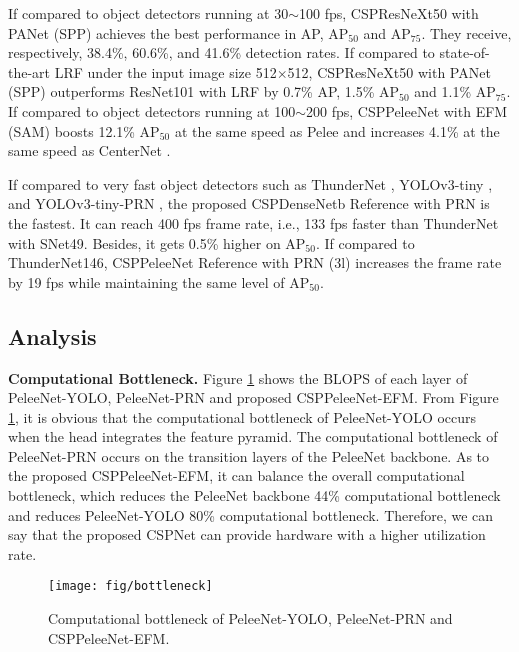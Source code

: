 \documentclass{article}
\begin{document}
If compared to object detectors running at 30$\sim$100 fps, CSPResNeXt50 with PANet (SPP) achieves the best performance in AP, AP$_{50}$ and AP$_{75}$.  They receive, respectively, 38.4\%, 60.6\%, and 41.6\% detection rates.  If compared to state-of-the-art LRF \cite{wang2019learning} under the input image size 512$\times$512, CSPResNeXt50 with PANet (SPP) outperforms ResNet101 with LRF by 0.7\% AP, 1.5\% AP$_{50}$ and 1.1\% AP$_{75}$.  If compared to object detectors running at 100$\sim$200 fps, CSPPeleeNet with EFM (SAM) boosts 12.1\% AP$_{50}$ at the same speed as Pelee \cite{wang2018pelee} and increases 4.1\% \cite{wang2018pelee} at the same speed as CenterNet \cite{zhou2019objects}.

If compared to very fast object detectors such as ThunderNet \cite{qin2019thundernet}, YOLOv3-tiny \cite{redmon2018yolov3}, and YOLOv3-tiny-PRN \cite{wang2019enriching}, the proposed CSPDenseNetb Reference with PRN is the fastest.  It can reach 400 fps frame rate, i.e., 133 fps faster than ThunderNet with SNet49.  Besides, it gets 0.5\% higher on AP$_{50}$.  If compared to ThunderNet146, CSPPeleeNet Reference with PRN (3l) increases the frame rate by 19 fps while maintaining the same level of AP$_{50}$.

\subsection{Analysis}

{\bf Computational Bottleneck.} Figure \ref{fig:bottleneck} shows the BLOPS of each layer of PeleeNet-YOLO, PeleeNet-PRN and proposed CSPPeleeNet-EFM.  From Figure \ref{fig:bottleneck}, it is obvious that the computational bottleneck of PeleeNet-YOLO occurs when the head integrates the feature pyramid.  The computational bottleneck of PeleeNet-PRN occurs on the transition layers of the PeleeNet backbone.  As to the proposed CSPPeleeNet-EFM, it can balance the overall computational bottleneck, which reduces the PeleeNet backbone 44\% computational bottleneck and reduces PeleeNet-YOLO 80\% computational bottleneck.  Therefore, we can say that the proposed CSPNet can provide hardware with a higher utilization rate.

\vspace*{1mm}

\begin{figure}[h]
	\begin{center}
		\texttt{[image: fig/bottleneck]}
	\end{center}
	\caption{Computational bottleneck of PeleeNet-YOLO, PeleeNet-PRN and CSPPeleeNet-EFM. }
	\label{fig:bottleneck}
\end{figure}
\end{document}
